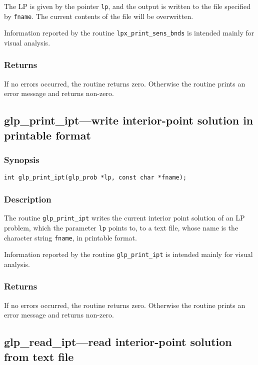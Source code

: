 The LP is given by the pointer \verb|lp|, and the output is written to
the file specified by \verb|fname|.  The current contents of the file
will be overwritten.

Information reported by the routine \verb|lpx_print_sens_bnds| is
intended mainly for visual analysis.

\subsubsection*{Returns}

If no errors occurred, the routine returns zero. Otherwise the routine
prints an error message and returns non-zero.

\subsection{glp\_print\_ipt---write interior-point solution in
printable format}

\subsubsection*{Synopsis}

\begin{verbatim}
int glp_print_ipt(glp_prob *lp, const char *fname);
\end{verbatim}

\subsubsection*{Description}

The routine \verb|glp_print_ipt| writes the current interior point
solution  of an LP problem, which the parameter \verb|lp| points to, to
a text file, whose name is the character string \verb|fname|, in
printable format.

Information reported by the routine \verb|glp_print_ipt| is intended
mainly for visual analysis.

\subsubsection*{Returns}

If no errors occurred, the routine returns zero. Otherwise the routine
prints an error message and returns non-zero.

\subsection{glp\_read\_ipt---read interior-point solution from text
file}

